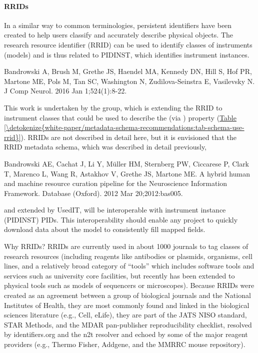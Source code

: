 \documentclass[a4paper,10pt,english]{sphinxmanual}
\begin{document}
\paragraph{RRIDs}
\label{\detokenize{white-paper/metadata-schema-recommendations:rrids}}
In a similar way to common terminologies, persistent identifiers have
been created to help users classify and accurately describe physical
objects.  The research resource identifier (RRID) can be used to identify
classes of instruments (models) and is thus related to PIDINST, which
identifies instrument instances.%
\begin{footnote}[1]\sphinxAtStartFootnote
Bandrowski A, Brush M, Grethe JS, Haendel MA, Kennedy DN, Hill S, Hof
PR, Martone ME, Pols M, Tan SC, Washington N, Zudilova-Seinstra E,
Vasilevsky N.  J
Comp Neurol. 2016 Jan 1;524(1):8-22.
%
\end{footnote} This work is undertaken
by the  group, which is extending the RRID to instrument classes
that could be used to describe the  (via ) property
(\hyperref[\detokenize{white-paper/metadata-schema-recommendations:tab-schema-use-rrid}]{Table \ref{\detokenize{white-paper/metadata-schema-recommendations:tab-schema-use-rrid}}}).  RRIDs are not described in detail
here, but it is envisioned that the RRID metadata schema, which was
described in detail previously,%
\begin{footnote}[2]\sphinxAtStartFootnote
Bandrowski AE, Cachat J, Li Y, Müller HM, Sternberg PW, Ciccarese P,
Clark T, Marenco L, Wang R, Astakhov V, Grethe JS, Martone ME. A
hybrid human and machine resource curation pipeline for the
Neuroscience Information Framework. Database (Oxford). 2012 Mar
20;2012:bas005. 
%
\end{footnote} and extended by
UsedIT, will be interoperable with instrument instance (PIDINST) PIDs.
This interoperability should enable any project to quickly download
data about the model to consistently fill mapped fields.

Why RRIDs? RRIDs are currently used in about 1000 journals to tag
classes of research resources (including reagents like antibodies or
plasmids, organisms, cell lines, and a relatively broad category of
“tools” which includes software tools and services such as university
core facilities, but recently has been extended to physical tools such
as models of sequencers or microscopes). Because RRIDs were created as
an agreement between a group of biological journals and the National
Institutes of Health, they are most commonly found and linked in the
biological sciences literature (e.g., Cell, eLife), they are part of the
JATS NISO standard, STAR Methods, and the MDAR pan-publisher
reproducibility checklist, resolved by identifiers.org and the n2t
resolver and echoed by some of the major reagent providers (e.g., Thermo
Fisher, Addgene, and the MMRRC mouse repository).
\end{document}
